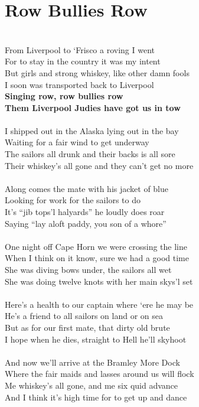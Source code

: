 \documentclass[letterpaper,14pt]{extarticle}
\begin{document}
\section{Row Bullies Row}
\noindent
\\From Liverpool to ‘Frisco a roving I went
\\For to stay in the country it was my intent
\\But girls and strong whiskey, like other damn fools
\\I soon was transported back to Liverpool 
\\\textbf{Singing row, row bullies row
\\Them Liverpool Judies have got us in tow}
\\
\\I shipped out in the Alaska lying out in the bay
\\Waiting for a fair wind to get underway
\\The sailors all drunk and their backs is all sore
\\Their whiskey’s all gone and they can’t get no more
\\
\\Along comes the mate with his jacket of blue
\\Looking for work for the sailors to do
\\It’s “jib tops’l halyards” he loudly does roar
\\Saying “lay aloft paddy, you son of a whore”
\\
\\One night off Cape Horn we were crossing the line
\\When I think on it know, sure we had a good time
\\She was diving bows under, the sailors all wet
\\She was doing twelve knots with her main skys’l set
\\
\\Here’s a health to our captain where ‘ere he may be
\\He’s a friend to all sailors on land or on sea
\\But as for our first mate, that dirty old brute
\\I hope when he dies, straight to Hell he’ll skyhoot
\\
\\And now we’ll arrive at the Bramley More Dock
\\Where the fair maids and lasses around us will flock
\\Me whiskey’s all gone, and me six quid advance
\\And I think it’s high time for to get up and dance
\end{document}
